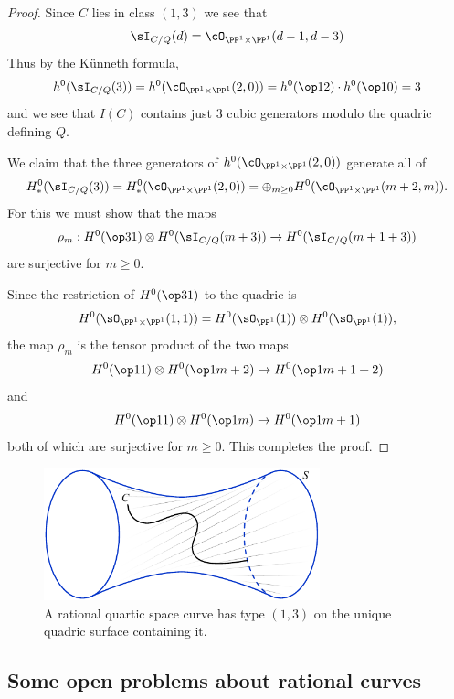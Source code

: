 \begin{proof}
Since $C$ lies in class $(1,3)$ we see that 
$$
\sI_{C/Q}(d) = \cO_{\PP^1\times \PP^1}(d-1, d-3)
%
$$
Thus by the K\"unneth formula,
$$
h^0(\sI_{C/Q}(3)) = h^0(\cO_{\PP^1\times \PP^1}(2, 0)) = h^0(\op12)\cdot h^0(\op10) = 3
$$
and we see that $I(C)$ contains just 3 cubic generators modulo the quadric defining $Q$. 

We claim that the three generators of $h^0(\cO_{\PP^1\times \PP^1}(2, 0))$ generate all of
$$
H^0_{*}(\sI_{C/Q}(3)) = H^0_{*}(\cO_{\PP^1\times \PP^1}(2, 0)) = 
\oplus_{m\geq 0}H^{0}(\cO_{\PP^1\times \PP^1}(m+2,m)).
$$
For this we must show that the maps
$$
\rho_{m}: H^{0}(\op31) \otimes H^0(\sI_{C/Q}(m+3)) \to H^0(\sI_{C/Q}(m+1+3))
$$
are surjective for $m\geq 0$.

Since the restriction
of $H^0(\op31)$ to the quadric is 
$$
H^0(\sO_{\PP^1\times \PP^1}(1,1)) = H^{0}(\sO_{\PP^{1}}(1)) \otimes H^{0}(\sO_{\PP^{1}}(1)),
$$
the map $\rho_{m}$
is the tensor product of the two maps
$$
H^{0}(\op11)\otimes H^{0}(\op1{m+2}) \to H^{0}(\op1{m+1+2})
$$
and 
$$
H^{0}(\op11)\otimes H^{0}(\op1{m}) \to H^{0}(\op1{m+1})
$$
both of which are surjective for $m\geq 0$. This completes the proof.
%
%
\end{proof}

\begin{figure}
\inprogress
\centerline{\includegraphics[height=1.5in]{"main/Fig03-1"}}
 \caption{A rational quartic space curve has type $(1,3)$ on the unique quadric surface containing it.}
\end{figure}


\subsection{Some open problems about rational curves}

